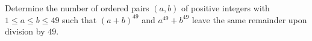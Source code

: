Determine the number of ordered pairs $\left(a,b\right)$ of positive integers with $1\leq a\leq b\leq49$ such that $\left(a+b\right)^{49}$ and $a^{49}+b^{49}$ leave the same remainder upon division by $49$.